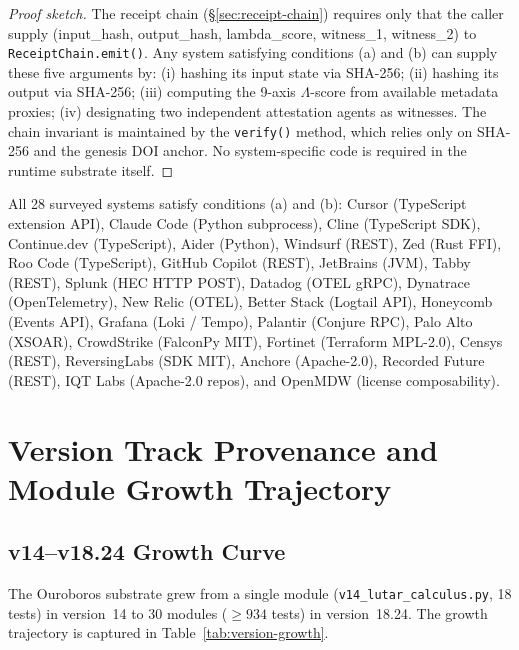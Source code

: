 \begin{proof}[Proof sketch]
  The receipt chain (\S\ref{sec:receipt-chain}) requires only that the
  caller supply (input\_hash, output\_hash, lambda\_score, witness\_1,
  witness\_2) to \texttt{ReceiptChain.emit()}.  Any system satisfying
  conditions (a) and (b) can supply these five arguments by: (i) hashing its
  input state via SHA-256; (ii) hashing its output via SHA-256; (iii)
  computing the 9-axis $\Lambda$-score from available metadata proxies;
  (iv) designating two independent attestation agents as witnesses.  The
  chain invariant is maintained by the \texttt{verify()} method, which
  relies only on SHA-256 and the genesis DOI anchor.  No system-specific
  code is required in the runtime substrate itself.
\end{proof}

All 28 surveyed systems satisfy conditions (a) and (b):
Cursor (TypeScript extension API), Claude Code (Python subprocess),
Cline (TypeScript SDK), Continue.dev (TypeScript),
Aider (Python), Windsurf (REST), Zed (Rust FFI), Roo Code (TypeScript),
GitHub Copilot (REST), JetBrains (JVM), Tabby (REST),
Splunk (HEC HTTP POST), Datadog (OTEL gRPC), Dynatrace (OpenTelemetry),
New Relic (OTEL), Better Stack (Logtail API), Honeycomb (Events API),
Grafana (Loki / Tempo), Palantir (Conjure RPC), Palo Alto (XSOAR),
CrowdStrike (FalconPy MIT), Fortinet (Terraform MPL-2.0),
Censys (REST), ReversingLabs (SDK MIT), Anchore (Apache-2.0),
Recorded Future (REST), IQT Labs (Apache-2.0 repos),
and OpenMDW (license composability).

\section{Version Track Provenance and Module Growth Trajectory}
\label{sec:version-track}

\subsection{v14--v18.24 Growth Curve}
\label{ssec:growth-curve}

The Ouroboros substrate grew from a single module (\texttt{v14\_lutar\_calculus.py},
18 tests) in version~14 to 30 modules ($\geq 934$ tests) in version~18.24.
The growth trajectory is captured in Table~\ref{tab:version-growth}.


